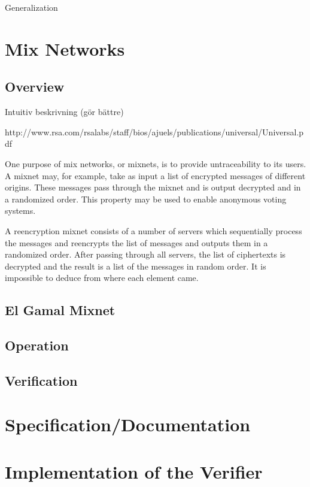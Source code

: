 \documentclass[10pt,a4paper]{article}
\begin{document}
Generalization

\section{Mix Networks}

\subsection{Overview}

Intuitiv beskrivning (gör bättre)

http://www.rsa.com/rsalabs/staff/bios/ajuels/publications/universal/Universal.pdf

One purpose of mix networks, or mixnets, is to provide untraceability
to its users. A mixnet may, for example, take as input a list of
encrypted messages of different origins. These messages pass through
the mixnet and is output decrypted and in a randomized order. This
property may be used to enable anonymous voting systems.

A reencryption mixnet consists of a number of servers which
sequentially process the messages and reencrypts the list of messages
and outputs them in a randomized order. After passing through all
servers, the list of ciphertexts is decrypted and the result is a list
of the messages in random order. It is impossible to deduce from where
each element came.

\subsection{El Gamal Mixnet}

\subsection{Operation}

\subsection{Verification}

\section{Specification/Documentation}

\section{Implementation of the Verifier}
\end{document}
